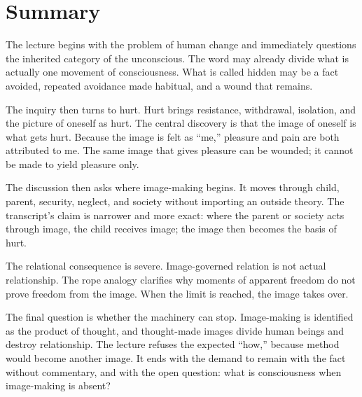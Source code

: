 \section{Summary}

The lecture begins with the problem of human change and immediately questions the inherited category of the unconscious. The word may already divide what is actually one movement of consciousness. What is called hidden may be a fact avoided, repeated avoidance made habitual, and a wound that remains.

The inquiry then turns to hurt. Hurt brings resistance, withdrawal, isolation, and the picture of oneself as hurt. The central discovery is that the image of oneself is what gets hurt. Because the image is felt as ``me,'' pleasure and pain are both attributed to me. The same image that gives pleasure can be wounded; it cannot be made to yield pleasure only.

The discussion then asks where image-making begins. It moves through child, parent, security, neglect, and society without importing an outside theory. The transcript's claim is narrower and more exact: where the parent or society acts through image, the child receives image; the image then becomes the basis of hurt.

The relational consequence is severe. Image-governed relation is not actual relationship. The rope analogy clarifies why moments of apparent freedom do not prove freedom from the image. When the limit is reached, the image takes over.

The final question is whether the machinery can stop. Image-making is identified as the product of thought, and thought-made images divide human beings and destroy relationship. The lecture refuses the expected ``how,'' because method would become another image. It ends with the demand to remain with the fact without commentary, and with the open question: what is consciousness when image-making is absent?
